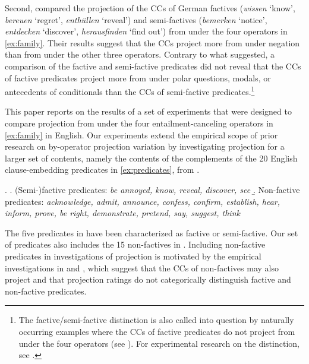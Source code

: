 \documentclass[a4paper,12pt,twoside]{article}
\begin{document}
    Second, \citet{sieker_projective_2022}  compared the projection of the CCs of German factives (\textit{wissen} `know', \textit{bereuen} `regret', \textit{ent\-hüllen} `reveal') and semi-factives (\textit{bemerken} `notice', \textit{entdecken} `discover', \textit{herausfinden} `find out') from under the four operators in \ref{ex:family}. Their results suggest that the CCs project more from under negation than from under the other three operators. Contrary to what \citet{karttunen_observations_1971} suggested, a comparison of the factive and semi-factive predicates did not reveal that the CCs of factive predicates project more from under polar questions, modals, or antecedents of conditionals than the CCs of semi-factive predicates.\footnote{The factive/semi-factive distinction is also called into question by naturally occurring examples where the CCs of factive predicates do not project from under the four operators (see \citealt{beaver_have_2010,de_marneffe_did_2012,de_marneffe_commitmentbank_2019}). For experimental research on the distinction, see \citealt{djarv_cognitive_2018}.
    }

    This paper reports on the results of a set of experiments that were designed to compare projection from under the four entailment-canceling operators in \ref{ex:family} in English. Our experiments extend the empirical scope of prior research on by-operator projection variation by investigating projection for a larger set of contents, namely the contents of the complements of the 20 English clause-embedding predicates in \ref{ex:predicates}, from \citet{degen_are_2022}.
    
    \ex. \label{ex:predicates}
    		\a. (Semi-)factive predicates: {\em be annoyed, know, reveal, discover, see}
      \b. Non-factive predicates: {\em acknowledge, admit, announce, confess, confirm, establish, hear, inform, prove, be right, demonstrate, pretend, say, suggest, think}
    
    The five predicates in \Last[a] have been characterized as factive or semi-factive. Our set of predicates also includes the 15 non-factives in \Last[b]. Including non-factive predicates in investigations of projection is motivated by the empirical investigations in \citealt{de_marneffe_commitmentbank_2019} and \citealt{degen_are_2022}, which suggest that the CCs of non-factives may also project and that projection ratings do not categorically distinguish factive and non-factive predicates.
  
\end{document}
